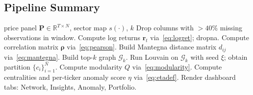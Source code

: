\subsection{Pipeline Summary}
\label{sec:pipeline-summary}

\begin{algorithm}[H]
\caption{NepGraph pipeline (per lookback window)}
\label{alg:pipeline}
\begin{algorithmic}[1]
\Require price panel $\bm{P}\in\mathbb{R}^{T\times N}$, sector map $s(\cdot)$, $k$
\State Drop columns with $>40\%$ missing observations in window.
\State Compute log returns $\bm{r}_t$ via~\eqref{eq:logret}; dropna.
\State Compute correlation matrix $\bm{\rho}$ via~\eqref{eq:pearson}.
\State Build Mantegna distance matrix $d_{ij}$ via~\eqref{eq:mantegna}.
\State Build top-$k$ graph $\mathcal{G}_k$.
\State Run Louvain on $\mathcal{G}_k$ with seed $\xi$; obtain partition $\{c_i\}_{i=1}^N$.
\State Compute modularity $Q$ via~\eqref{eq:modularity}.
\State Compute centralities and per-ticker anomaly score $\eta$ via~\eqref{eq:etadef}.
\State Render dashboard tabs: Network, Insights, Anomaly, Portfolio.
\end{algorithmic}
\end{algorithm}

\newpage
